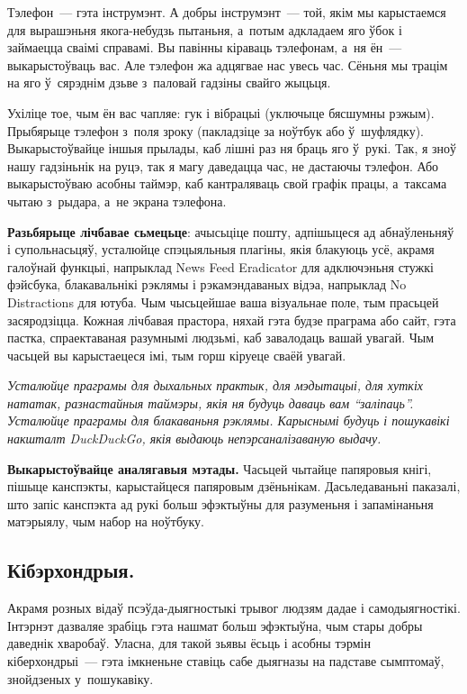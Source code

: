 
Тэлефон~--- гэта інструмэнт. А добры інструмэнт~--- той, якім мы карыстаемся для вырашэньня якога-небудзь пытаньня, а~потым адкладаем яго ўбок і займаецца сваімі справамі. Вы павінны кіраваць тэлефонам, а~ня ён~--- выкарыстоўваць вас. Але тэлефон жа адцягвае нас увесь час. Сёньня мы трацім на яго ў~сярэднім дзьве з~паловай гадзіны свайго жыцьця.

Ухіліце тое, чым ён вас чапляе: гук і вібрацыі (уключыце бясшумны рэжым). Прыбярыце тэлефон з~поля зроку (пакладзіце за ноўтбук або ў~шуфлядку). Выкарыстоўвайце іншыя прылады, каб лішні раз ня браць яго ў~рукі. Так, я зноў нашу гадзіньнік на руцэ, так я магу даведацца час, не дастаючы тэлефон. Або выкарыстоўваю асобны таймэр, каб кантраляваць свой графік працы, а~таксама чытаю з~рыдара, а~не экрана тэлефона.

\textbf{Разьбярыце лічбавае сьмецьце}: ачысьціце пошту, адпішыцеся ад абнаўленьняў і супольнасьцяў, усталюйце спэцыяльныя плагіны, якія блакуюць усё, акрамя галоўнай функцыі, напрыклад News Feed Eradicator для адключэньня стужкі фэйсбука, блакавальнікі рэклямы і рэкамэндаваных відэа, напрыклад No Distractions для ютуба. Чым чысьцейшае ваша візуальнае поле, тым прасьцей засяродзіцца. Кожная лічбавая прастора, няхай гэта будзе праграма або сайт, гэта пастка, спраектаваная разумнымі людзьмі, каб завалодаць вашай увагай. Чым часьцей вы карыстаецеся імі, тым горш кіруеце сваёй увагай.

\emph{Усталюйце праграмы для дыхальных практык, для мэдытацыі, для хуткіх нататак, разнастайныя таймэры, якія ня будуць даваць вам ``заліпаць''. Усталюйце праграмы для блакаваньня рэклямы. Карыснымі будуць і пошукавікі накшталт DuckDuckGo, якія выдаюць непэрсаналізаваную выдачу.}

\textbf{Выкарыстоўвайце аналягавыя мэтады.} Часьцей чытайце папяровыя кнігі, пішыце канспэкты, карыстайцеся папяровым дзёньнікам. Дасьледаваньні паказалі, што запіс канспэкта ад рукі больш эфэктыўны для разуменьня і запамінаньня матэрыялу, чым набор на ноўтбуку.

\subsection*{Кібэрхондрыя.}

Акрамя розных відаў псэўда-дыягностыкі трывог людзям дадае і самодыягностікі. Інтэрнэт дазваляе зрабіць гэта нашмат больш эфэктыўна, чым стары добры даведнік хваробаў. Уласна, для такой зьявы ёсьць і асобны тэрмін кіберхондрыі~--- гэта імкненьне ставіць сабе дыягназы на падставе сымптомаў, знойдзеных у~пошукавіку.

